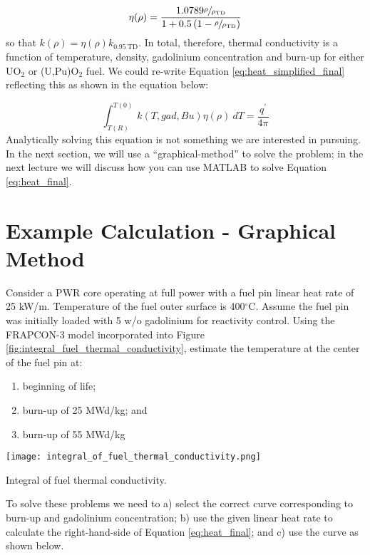 \begin{equation}
\eta(\rho) = \frac{1.0789 \sfrac{\rho}{\rho_{\text{TD}}}}{1 + 0.5\left(1 - \sfrac{\rho}{\rho_{\text{TD}}} \right)} 
\label{eq:FRAP_density}
\end{equation}
so that $k(\rho) = \eta(\rho)k_{0.95 \ \text{TD}}$. In total, therefore, thermal conductivity is a function of temperature, density, gadolinium concentration and burn-up for either UO$_2$ or (U,Pu)O$_2$ fuel.  We could re-write Equation \ref{eq:heat_simplified_final} reflecting this as shown in the equation below:

\begin{equation}
\int_{T(R)}^{T(0)} k(T,gad,Bu)\eta(\rho) \ dT = \frac{q^{\prime}}{4 \pi}
\label{eq:heat_final}
\end{equation}
Analytically solving this equation is not something we are interested in pursuing. In the next section, we will use a ``graphical-method'' to solve the problem; in the next lecture we will discuss how you can use MATLAB to solve Equation \ref{eq:heat_final}.

\section{Example Calculation - Graphical Method}

Consider a PWR core operating at full power with a fuel pin linear heat rate of 25 kW/m.  Temperature of the fuel outer surface is 400$^{\circ}$C. Assume the fuel pin was initially loaded with 5 w/o gadolinium for reactivity control.  Using the FRAPCON-3 model incorporated into Figure \ref{fig:integral_fuel_thermal_conductivity}, estimate the temperature at the center of the fuel pin at:
\begin{enumerate}
\item beginning of life;
\item burn-up of 25 MWd/kg; and
\item burn-up of 55 MWd/kg
\end{enumerate}

\begin{marginfigure}
\texttt{[image: integral\_of\_fuel\_thermal\_conductivity.png]}
\caption{Integral of fuel thermal conductivity.}
\label{fig:integral_fuel_thermal_conductivity}
\end{marginfigure}

To solve these problems we need to a) select the correct curve corresponding to burn-up and gadolinium concentration; b) use the given linear heat rate to calculate the right-hand-side of Equation \ref{eq:heat_final}; and c) use the curve as shown below.

